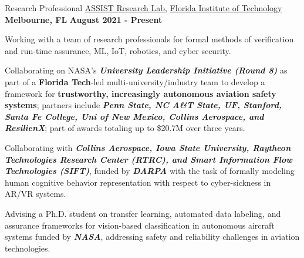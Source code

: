 


\begin{cventries}

\cventry
{Research Professional}
{\href{https://research.fit.edu/assist-lab/}{ASSIST Research Lab}, \href{www.fit.edu}{Florida Institute of Technology}}
{\textbf{Melbourne, FL}}
{\textbf{August 2021 - Present}}
{
\begin{cvitems}
\item Working with a team of research professionals for formal methods of verification and run-time assurance, ML, IoT, robotics, and cyber security.
\item Collaborating on NASA’s \textit{\textbf{University Leadership Initiative (Round 8)}} as part of a \textbf{Florida Tech}-led multi-university/industry team to develop a framework for \textbf{trustworthy, increasingly autonomous aviation safety systems}; partners include \textit{\textbf{Penn State, NC A\&T State, UF, Stanford, Santa Fe College, Uni of New Mexico, Collins Aerospace, and ResilienX}}; part of awards totaling up to \$20.7M over three years.
\item Collaborating with \textit{\textbf{Collins Aerospace, Iowa State University, Raytheon Technologies Research Center (RTRC), and Smart Information Flow Technologies (SIFT)}}, funded by \textit{\textbf{DARPA}} with the task of formally modeling human cognitive behavior representation with respect to cyber-sickness in AR/VR systems. 
\item Advising a Ph.D. student on transfer learning, automated data labeling, and assurance frameworks for vision-based classification in autonomous aircraft systems funded by \textit{\textbf{NASA}}, addressing safety and reliability challenges in aviation technologies.

\end{cvitems}}
\end{cventries}
